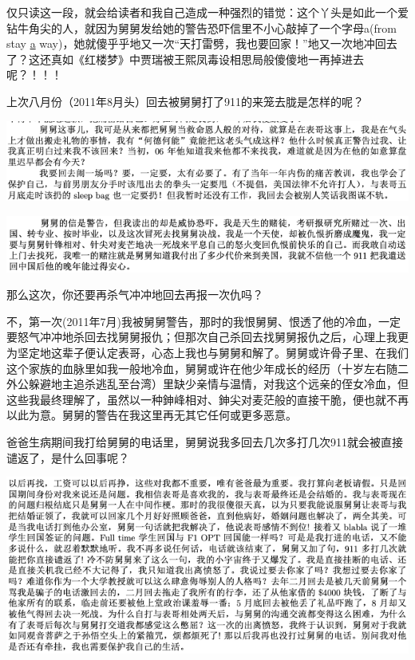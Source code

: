 \documentclass[9pt, b5paper]{article}
\begin{document}
仅只读这一段，就会给读者和我自己造成一种强烈的错觉：这个丫头是如此一个爱钻牛角尖的人，就因为舅舅发给她的警告恐吓信里不小心敲掉了一个字母a(from stay \uline{a} way)，她就傻乎乎地又一次“天打雷劈，我也要回家！”地又一次地冲回去了？这还真如《红楼梦》中贾瑞被王熙凤毒设相思局般傻傻地一再掉进去呢？！！！

上次八月份（2011年8月头）回去被舅舅打了911的来笼去胧是怎样的呢？

\begin{center}
\includegraphics[width=.9\linewidth]{./pic/p1p66-5.png}
\end{center}

\begin{center}
\includegraphics[width=.9\linewidth]{./pic/p1p67-2.png}
\end{center}

那么这次，你还要再杀气冲冲地回去再报一次仇吗？

不，第一次(2011年7月)我被舅舅警告，那时的我恨舅舅、恨透了他的冷血，一定要怒气冲冲地杀回去找舅舅报仇；但那次自己杀回去找舅舅报仇之后，心理上我更为坚定地这辈子便认定表哥，心态上我也与舅舅和解了。舅舅或许骨子里、在我们这个家族的血脉里如我一般地冷血，舅舅或许在他少年成长的经历（十岁左右随二外公躲避地主追杀逃乱至台湾）里缺少亲情与温情，对我这个远亲的侄女冷血，但这些我最终理解了，虽然以一种鉮峰相对、鉮尖对麦茫般的直接干脆，便也就不再以此为意。舅舅的警告在我这里再无其它任何或更多恶意。 

爸爸生病期间我打给舅舅的电话里，舅舅说我多回去几次多打几次911就会被直接谴返了，是什么回事呢？

\begin{center}
\includegraphics[width=.9\linewidth]{./pic/p1p76-2.png}
\end{center}
\end{document}
